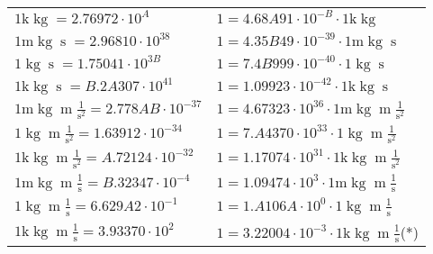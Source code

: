 \begin{center}
\begin{longtable}{l l}
{\color{gray}$1 \bm{\mathrm{ k}}\operatorname{kg}{}{}{}{} = 2.76972\cdot10^{A} $}   & {\color{gray}$ 1 = 4.68A91\cdot10^{-B} \cdot 1 \bm{\mathrm{ k}}\operatorname{kg}{}{}{}{}$}  \\
{\color{gray}$1 \bm{\mathrm{ m}}\operatorname{kg}{}{\operatorname{s}}{}{} = 2.96810\cdot10^{38} $}   & {\color{gray}$ 1 = 4.35B49\cdot10^{-39} \cdot 1 \bm{\mathrm{ m}}\operatorname{kg}{}{\operatorname{s}}{}{}$}  \\
{\color{black}$1 \bm{\mathrm{ }}\operatorname{kg}{}{\operatorname{s}}{}{} = 1.75041\cdot10^{3B} $}   & {\color{black}$ 1 = 7.4B999\cdot10^{-40} \cdot 1 \bm{\mathrm{ }}\operatorname{kg}{}{\operatorname{s}}{}{}$}  \\
{\color{gray}$1 \bm{\mathrm{ k}}\operatorname{kg}{}{\operatorname{s}}{}{} = B.2A307\cdot10^{41} $}   & {\color{gray}$ 1 = 1.09923\cdot10^{-42} \cdot 1 \bm{\mathrm{ k}}\operatorname{kg}{}{\operatorname{s}}{}{}$}  \\
{\color{gray}$1 \bm{\mathrm{ m}}\operatorname{kg}{\operatorname{m}}\frac1{\operatorname{s}^2}{}{} = 2.778AB\cdot10^{-37} $}   & {\color{gray}$ 1 = 4.67323\cdot10^{36} \cdot 1 \bm{\mathrm{ m}}\operatorname{kg}{\operatorname{m}}\frac1{\operatorname{s}^2}{}{}$}  \\
{\color{black}$1 \bm{\mathrm{ }}\operatorname{kg}{\operatorname{m}}\frac1{\operatorname{s}^2}{}{} = 1.63912\cdot10^{-34} $}   & {\color{black}$ 1 = 7.A4370\cdot10^{33} \cdot 1 \bm{\mathrm{ }}\operatorname{kg}{\operatorname{m}}\frac1{\operatorname{s}^2}{}{}$}  \\
{\color{gray}$1 \bm{\mathrm{ k}}\operatorname{kg}{\operatorname{m}}\frac1{\operatorname{s}^2}{}{} = A.72124\cdot10^{-32} $}   & {\color{gray}$ 1 = 1.17074\cdot10^{31} \cdot 1 \bm{\mathrm{ k}}\operatorname{kg}{\operatorname{m}}\frac1{\operatorname{s}^2}{}{}$}  \\
{\color{gray}$1 \bm{\mathrm{ m}}\operatorname{kg}{\operatorname{m}}\frac1{\operatorname{s}}{}{} = B.32347\cdot10^{-4} $}   & {\color{gray}$ 1 = 1.09474\cdot10^{3} \cdot 1 \bm{\mathrm{ m}}\operatorname{kg}{\operatorname{m}}\frac1{\operatorname{s}}{}{}$}  \\
{\color{black}$1 \bm{\mathrm{ }}\operatorname{kg}{\operatorname{m}}\frac1{\operatorname{s}}{}{} = 6.629A2\cdot10^{-1} $}   & {\color{black}$ 1 = 1.A106A\cdot10^{0} \cdot 1 \bm{\mathrm{ }}\operatorname{kg}{\operatorname{m}}\frac1{\operatorname{s}}{}{}$}  \\
{\color{gray}$1 \bm{\mathrm{ k}}\operatorname{kg}{\operatorname{m}}\frac1{\operatorname{s}}{}{} = 3.93370\cdot10^{2} $}   & {\color{gray}$ 1 = 3.22004\cdot10^{-3} \cdot 1 \bm{\mathrm{ k}}\operatorname{kg}{\operatorname{m}}\frac1{\operatorname{s}}{}{}$}\quad(*)\\

\end{longtable}
\end{center}

